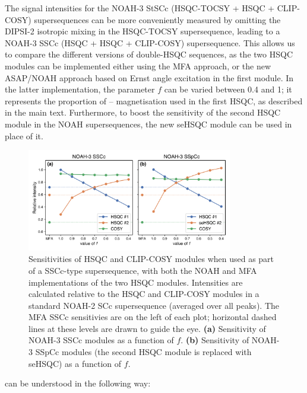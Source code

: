 The signal intensities for the NOAH-3 StSCc (HSQC-TOCSY + HSQC + CLIP-COSY) supersequences can be more conveniently measured by omitting the DIPSI-2 isotropic mixing in the HSQC-TOCSY supersequence, leading to a NOAH-3 SSCc (HSQC + HSQC + CLIP-COSY) supersequence.
This allows us to compare the different versions of double-HSQC sequences, as the two HSQC modules can be implemented either using the MFA approach, or the new ASAP/NOAH approach based on Ernst angle excitation in the first module.
In the latter implementation, the parameter $f$ can be varied between 0.4 and 1; it represents the proportion of \carbon{}--\proton{} magnetisation used in the first HSQC, as described in the main text.
Furthermore, to boost the sensitivity of the second HSQC module in the NOAH supersequences, the new seHSQC module can be used in place of it.

\begin{figure}
    \centering
    \includegraphics[width=0.8\textwidth]{./figures/ssc_comparisons.png}
    \caption{
        Sensitivities of HSQC and CLIP-COSY modules when used as part of a SSCc-type supersequence, with both the NOAH and MFA implementations of the two HSQC modules.
        Intensities are calculated relative to the HSQC and CLIP-COSY modules in a standard NOAH-2 SCc supersequence (averaged over all peaks).
        The MFA SSCc sensitivies are on the left of each plot; horizontal dashed lines at these levels are drawn to guide the eye.
        \textbf{(a)} Sensitivity of NOAH-3 SSCc modules as a function of $f$.
        \textbf{(b)} Sensitivity of NOAH-3 SSpCc modules (the second HSQC module is replaced with seHSQC) as a function of $f$.
        \andro{}
    }
    \label{fig:ssc_comparisons}
\end{figure}

 can be understood in the following way:

